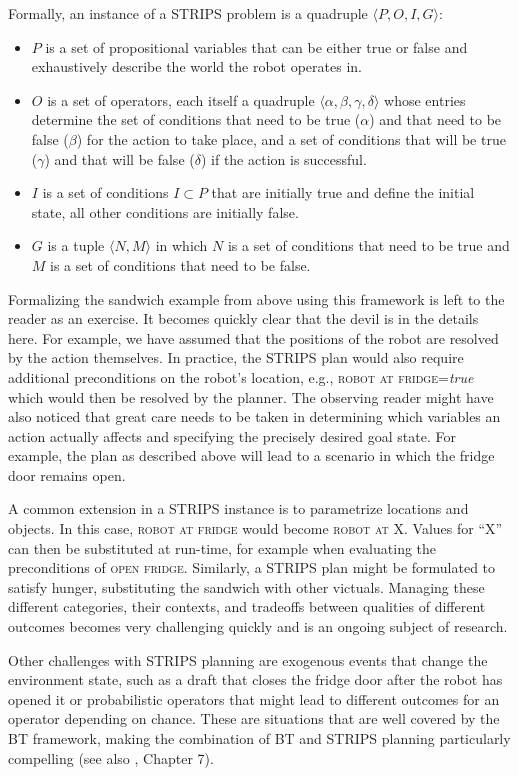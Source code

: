 Formally, an instance of a STRIPS problem is a quadruple $\langle P, O, I, G \rangle$:
\begin{itemize}
\item $P$ is a set of propositional variables that can be either true or false and exhaustively describe the world the robot operates in.
\item $O$ is a set of operators, each itself a quadruple $\langle \alpha, \beta, \gamma, \delta \rangle$ whose entries determine the set of conditions that need to be true ($\alpha$) and that need to be false ($\beta$) for the action to take place, and a set of conditions that will be true ($\gamma$) and that will be false ($\delta$) if the action is successful.
\item $I$ is a set of conditions $I \subset P$ that are initially true and define the initial state, all other conditions are initially false.
\item $G$ is a tuple $\langle N, M\rangle$ in which $N$ is a set of conditions that need to be true and $M$ is a set of conditions that need to be false.
\end{itemize}

Formalizing the sandwich example from above using this framework is left to the reader as an exercise. It becomes quickly clear that the devil is in the details here. For example, we have assumed that the positions of the robot are resolved by the action themselves. In practice, the STRIPS plan would also require additional preconditions on the robot's location, e.g., \textsc{robot at fridge}=\textsl{true} which would then be resolved by the planner. The observing reader might have also noticed that great care needs to be taken in determining which variables an action actually affects and specifying the precisely desired goal state. For example, the plan as described above will lead to a scenario in which the fridge door remains open.

A common extension in a STRIPS instance is to parametrize locations and objects. In this case, \textsc{robot at fridge} would become \textsc{robot at X}. Values for ``X'' can then be substituted at run-time, for example when evaluating the preconditions of \textsc{open fridge}. Similarly, a STRIPS plan might be formulated to satisfy hunger, substituting the sandwich with other victuals. Managing these different categories, their contexts, and tradeoffs between qualities of different outcomes becomes very challenging quickly and is an ongoing subject of research. 

Other challenges with STRIPS planning are exogenous events that change the environment state, such as a draft that closes the fridge door after the robot has opened it or probabilistic operators that might lead to different outcomes for an operator depending on chance. These are situations that are well covered by the BT framework, making the combination of BT and STRIPS planning particularly compelling (see also \cite{colledanchise2018behavior}, Chapter 7). 


